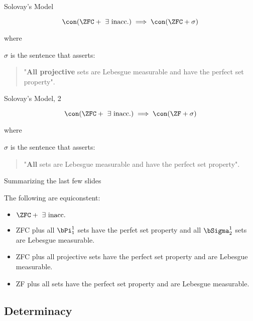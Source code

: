\documentclass{beamer}
\begin{document}
\begin{frame}{Solovay's Model}
\begin{theorem}[Solovay, 1970]

$$\con(\ZFC + \text{ } \exists \text{ inacc.}) \implies \con(\ZFC + \sigma)$$

where

$\sigma$ is the sentence that asserts:

\begin{quotation}
"\textbf{All projective} sets are Lebesgue
measurable and have the perfect set property".
\end{quotation}

\end{theorem}
\end{frame}

\begin{frame}{Solovay's Model, 2}
\begin{theorem}[Solovay, 1970]

$$\con(\ZFC + \text{ } \exists \text{ inacc.}) \implies \con(\ZF + \sigma)$$

where

$\sigma$ is the sentence that asserts:

\begin{quotation}
"\textbf{All} sets are Lebesgue
measurable and have the perfect set property".
\end{quotation}
\end{theorem}
\end{frame}

\begin{frame}{Summarizing the last few slides}

The following are equiconstent:

\begin{itemize}
  \item $\ZFC + \text{ } \exists \text{ inacc.}$
  \item ZFC plus all $\bPi^1_1$ sets have the perfet set property and all $\bSigma^1_2$ sets are Lebesgue measurable.
  \item ZFC plus all projective sets have the perfect set property and are Lebesgue measurable.
  \item ZF plus all sets have the perfect set property and are Lebesgue measurable.
\end{itemize}

\end{frame}


\subsection{Determinacy}
\end{document}
